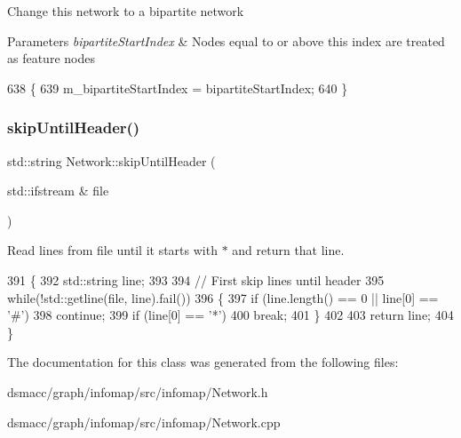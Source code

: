 Change this network to a bipartite network 
\begin{DoxyParams}{Parameters}
{\em bipartite\+Start\+Index} & Nodes equal to or above this index are treated as feature nodes \\
\hline
\end{DoxyParams}

\begin{DoxyCode}
638 \{
639     m\_bipartiteStartIndex = bipartiteStartIndex;
640 \}
\end{DoxyCode}
\mbox{\label{classNetwork_afd458fbfc07fc12e8ca3d6ec4e6a7291}} 
\subsubsection{\texorpdfstring{skip\+Until\+Header()}{skipUntilHeader()}}
{\footnotesize\ttfamily std\+::string Network\+::skip\+Until\+Header (\begin{DoxyParamCaption}\item[{std\+::ifstream \&}]{file }\end{DoxyParamCaption})\hspace{0.3cm}{\ttfamily [protected]}}

Read lines from file until it starts with \textquotesingle{}$\ast$\textquotesingle{} and return that line. 
\begin{DoxyCode}
391 \{
392     std::string line;
393 
394     \textcolor{comment}{// First skip lines until header}
395     \textcolor{keywordflow}{while}(!std::getline(file, line).fail())
396     \{
397         \textcolor{keywordflow}{if} (line.length() == 0 || line[0] == \textcolor{charliteral}{'#'})
398             \textcolor{keywordflow}{continue};
399         \textcolor{keywordflow}{if} (line[0] == \textcolor{charliteral}{'*'})
400             \textcolor{keywordflow}{break};
401     \}
402 
403     \textcolor{keywordflow}{return} line;
404 \}
\end{DoxyCode}


The documentation for this class was generated from the following files\+:\begin{DoxyCompactItemize}
\item 
dsmacc/graph/infomap/src/infomap/Network.\+h\item 
dsmacc/graph/infomap/src/infomap/Network.\+cpp\end{DoxyCompactItemize}

